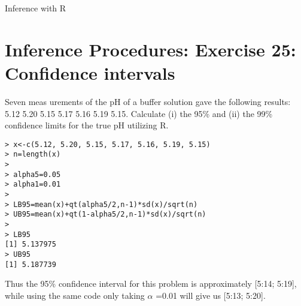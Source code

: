 Inference with R



\section{Inference Procedures: Exercise 25: Confidence intervals}
Seven meas urements of the pH of a buffer solution gave the following results:
5.12 5.20 5.15 5.17 5.16 5.19 5.15. Calculate (i) the 95\% and (ii) the 99\% confidence limits for the true pH
utilizing R.

\begin{verbatim}
> x<-c(5.12, 5.20, 5.15, 5.17, 5.16, 5.19, 5.15)
> n=length(x)
>
> alpha5=0.05
> alpha1=0.01
>
> LB95=mean(x)+qt(alpha5/2,n-1)*sd(x)/sqrt(n)
> UB95=mean(x)+qt(1-alpha5/2,n-1)*sd(x)/sqrt(n)
>
> LB95
[1] 5.137975
> UB95
[1] 5.187739
\end{verbatim}

Thus the 95\% confidence interval for this problem is approximately [5:14; 5:19], while
using the same code only taking $\alpha$ =0.01 will give us [5:13; 5:20].